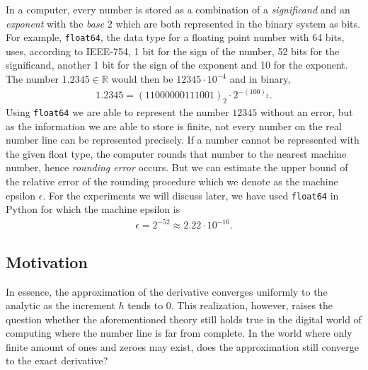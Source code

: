 In a computer, every number is stored as a combination of a \textit{significand} and an \textit{exponent} with the \textit{base} \(2\) which are both represented in the binary system as bits. For example, \texttt{float64}, the data type for a floating point number with 64 bits, uses, according to IEEE-754, 1 bit for the sign of the number, 52 bits for the significand, another 1 bit for the sign of the exponent and 10 for the exponent. The number \(1.2345 \in \mathbb{R}\) would then be \(12345 \cdot 10^{-4}\) and in binary,
\begin{align*}
    1.2345 = (11000000111001)_2 \cdot 2^{-(100)_2}\text{.}
\end{align*}
Using \texttt{float64} we are able to represent the number \(12345\) without an error, but as the information we are able to store is finite, not every number on the real number line can be represented precisely. If a number cannot be represented with the given float type, the computer rounds that number to the nearest machine number, hence \textit{rounding error} occurs. But we can estimate the upper bound of the relative error of the rounding procedure which we denote as the machine epsilon \(\epsilon\). For the experiments we will discuss later, we have used \texttt{float64} in Python for which the machine epsilon is
\begin{align*}
    \epsilon = 2^{-52} \approx 2.22 \cdot 10^{-16} \text{.}
\end{align*}

\subsection{Motivation}
In essence, the approximation of the derivative converges uniformly to the analytic as the increment \(h\) tends to \(0\). This realization, however, raises the question whether the aforementioned theory still holds true in the digital world of computing where the number line is far from complete. In the world where only finite amount of ones and zeroes may exist, does the approximation still converge to the exact derivative?\\